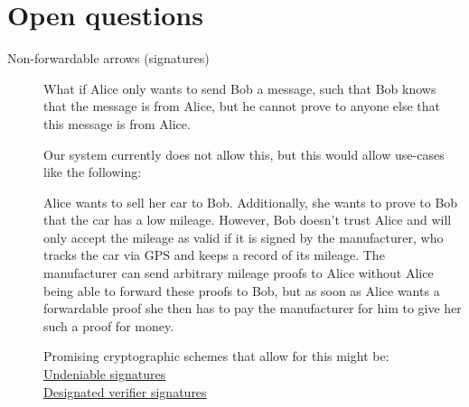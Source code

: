 \documentclass[a4paper]{article} %
\begin{document}
\section{Open questions}
\begin{description}
\item[Non-forwardable arrows (signatures)]
What if Alice only wants to send Bob a message, such that Bob knows that the message is from Alice, but he cannot prove to anyone else that this message is from Alice.

Our system currently does not allow this, but this would allow use-cases like the following:

Alice wants to sell her car to Bob. Additionally, she wants to prove to Bob that the car has a low mileage. However, Bob doesn't trust Alice and will only accept the mileage as valid if it is signed by the manufacturer, who tracks the car via GPS and keeps a record of its mileage. The manufacturer can send arbitrary mileage proofs to Alice without Alice being able to forward these proofs to Bob, but as soon as Alice wants a forwardable proof she then has to pay the manufacturer for him to give her such a proof for money.

Promising cryptographic schemes that allow for this might be: \\
\href{https://en.wikipedia.org/wiki/Undeniable_signature}{Undeniable signatures} \\
\href{https://en.wikipedia.org/wiki/Designated_verifier_signature}{Designated verifier signatures} \\
\end{description}
\end{document}
